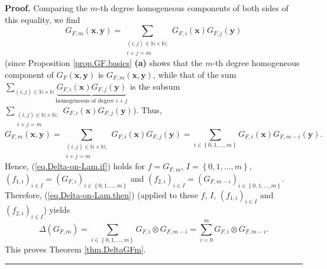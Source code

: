 \documentclass[numbers=enddot,12pt,final,onecolumn,notitlepage]{scrartcl}%
\theoremstyle{definition}
\newenvironment{proof}[1][Proof]{\noindent\textbf{#1.} }{\ \rule{0.5em}{0.5em}}
\let\sumnonlimits\sum
\renewcommand{\sum}{\sumnonlimits\limits}
\newenvironment{vershort}{}{}
\begin{document}
\begin{vershort}
\begin{proof}
Comparing the $m$-th degree homogeneous components of both sides of this
equality, we find%
\[
G_{F,m}\left(  \mathbf{x},\mathbf{y}\right)  =\sum_{\substack{\left(
i,j\right)  \in\mathbb{N}\times\mathbb{N};\\i+j=m}}G_{F,i}\left(
\mathbf{x}\right)  G_{F,j}\left(  \mathbf{y}\right)
\]
(since Proposition \ref{prop.GF.basics} \textbf{(a)} shows that the $m$-th
degree homogeneous component of $G_{F}\left(  \mathbf{x},\mathbf{y}\right)  $
is $G_{F,m}\left(  \mathbf{x},\mathbf{y}\right)  $, while that of the sum
$\sum_{\left(  i,j\right)  \in\mathbb{N}\times\mathbb{N}}\underbrace{G_{F,i}%
\left(  \mathbf{x}\right)  G_{F,j}\left(  \mathbf{y}\right)  }%
_{\text{homogeneous of degree }i+j}$ is the subsum $\sum_{\substack{\left(
i,j\right)  \in\mathbb{N}\times\mathbb{N};\\i+j=m}}G_{F,i}\left(
\mathbf{x}\right)  G_{F,j}\left(  \mathbf{y}\right)  $). Thus,%
\[
G_{F,m}\left(  \mathbf{x},\mathbf{y}\right)  =\sum_{\substack{\left(
i,j\right)  \in\mathbb{N}\times\mathbb{N};\\i+j=m}}G_{F,i}\left(
\mathbf{x}\right)  G_{F,j}\left(  \mathbf{y}\right)  =\sum_{i\in\left\{
0,1,\ldots,m\right\}  }G_{F,i}\left(  \mathbf{x}\right)  G_{F,m-i}\left(
\mathbf{y}\right)  .
\]
Hence, (\ref{eq.Delta-on-Lam.if}) holds for $f=G_{F,m}$, $I=\left\{
0,1,\ldots,m\right\}  $, $\left(  f_{1,i}\right)  _{i\in I}=\left(
G_{F,i}\right)  _{i\in\left\{  0,1,\ldots,m\right\}  }$ and $\left(
f_{2,i}\right)  _{i\in I}=\left(  G_{F,m-i}\right)  _{i\in\left\{
0,1,\ldots,m\right\}  }$. Therefore, (\ref{eq.Delta-on-Lam.then}) (applied to
these $f$, $I$, $\left(  f_{1,i}\right)  _{i\in I}$ and $\left(
f_{2,i}\right)  _{i\in I}$) yields%
\[
\Delta\left(  G_{F,m}\right)  =\sum_{i\in\left\{  0,1,\ldots,m\right\}
}G_{F,i}\otimes G_{F,m-i}=\sum_{i=0}^{m}G_{F,i}\otimes G_{F,m-i}.
\]
This proves Theorem \ref{thm.DeltaGFm}.
\end{proof}
\end{vershort}
\end{document}
